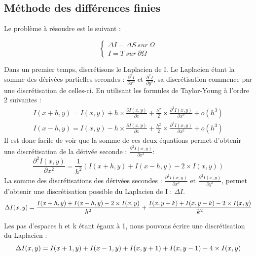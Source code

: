 \subsection{Méthode des différences finies }
Le problème à résoudre est le suivant : 
\begin{center}

\begin{equation*}
    \left \{
    \begin{aligned}
    \Delta I = \Delta S \ sur \ \Omega\\
    I = T \ sur \ \partial \Omega
    \end{aligned}
    \right.
\end{equation*}
\end{center}
Dans un premier temps, discrétisons le Laplacien de I. Le Laplacien étant la somme des dérivées partielles secondes : $\frac{\partial^2 I}{\partial x^2}$ et  $\frac{\partial^2 I}{\partial y^2}$, sa discrétisation commence par une discrétisation de celles-ci. En utilisant les formules de Taylor-Young à l'ordre 2 suivantes :
\begin{equation*}
\begin{aligned}
    I(x+h,y) = I(x,y)+h\times \frac{\partial I(x,y)}{\partial x}+ \frac{h^2}{2} \times \frac{\partial ^2 I(x,y)}{\partial x^2} + o(h^3) \\
    I(x-h,y) =I(x,y)- h\times  \frac{\partial I(x,y)}{\partial x}+ \frac{h^2}{2} \times \frac{\partial^2 I(x,y)}{\partial x^2} + o(h^3)
\end{aligned}
\end{equation*}
Il est donc facile de voir que la somme de ces deux équations permet d'obtenir une discrétisation de la dérivée seconde : $\frac{\partial ^2 I(x,y)}{\partial x^2}$:  
\begin{equation*}
    \frac{\partial ^2 I(x,y)}{\partial x^2} =\frac{1}{h^2}\left( I(x+h,y) + I(x-h,y) - 2\times I(x,y)\right)
\end{equation*}
La somme des discrétisations des dérivées secondes : $\frac{\partial ^2 I(x,y)}{\partial x^2}$ et $\frac{\partial ^2 I(x,y)}{\partial y^2}$, permet d'obtenir une discrétisation possible du Laplacien de I : $\Delta I$.
\begin{equation*}
    \Delta I(x,y) =  \frac{I(x+h,y) + I(x-h,y) - 2\times I(x,y)}{h^2}  + \frac{I(x,y+k) + I(x,y-k) - 2\times I(x,y)}{k^2} \\
\end{equation*}

Les pas d'espaces h et k étant égaux à 1, nous pouvons écrire une discrétisation du Laplacien  :
\begin{equation*}
     \Delta I(x,y) =  I(x+1,y) + I(x-1,y)+ I(x,y+1) + I(x,y-1) - 4\times I(x,y)  \\
\end{equation*}

